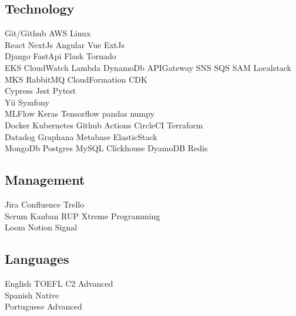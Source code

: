 \documentclass[]{deedy-resume-reversed}
\begin{document}
\begin{minipage}[t]{0.33\textwidth}
\subsection{\fontsize{10}{12}\selectfont Technology}
Git/Github \textbullet{} AWS \textbullet{} Linux \\
React \textbullet{} NextJs \textbullet{} Angular \textbullet{} Vue \textbullet{} ExtJs\\
Django \textbullet{} FastApi \textbullet{} Flask \textbullet{}  Tornado \\
EKS \textbullet{} CloudWatch \textbullet{} Lambda \textbullet{} DynamoDb \textbullet{} APIGateway \textbullet{} SNS  \textbullet{} SQS \textbullet{} SAM \textbullet{} Localstack \textbullet{} MKS \textbullet{} RabbitMQ \textbullet{} CloudFormation \textbullet{} CDK\\
Cypress \textbullet{} Jest \textbullet{} Pytest\\
Yii \textbullet{} Symfony\\
MLFlow \textbullet{} Keras \textbullet{} Tensorflow \textbullet{} pandas \textbullet{} numpy\\
Docker \textbullet{} Kubernetes \textbullet{} Github Actions \textbullet{} CircleCI \textbullet{} Terraform\\
Datadog \textbullet{} Graphana \textbullet{} Metabase \textbullet{} ElasticStack\\
MongoDb \textbullet{} Postgres \textbullet{} MySQL \textbullet{} Clickhouse \textbullet{} DyamoDB \textbullet{} Redis\\
\sectionsep

\subsection{\fontsize{10}{12}\selectfont Management}
Jira \textbullet{} Confluence \textbullet{} Trello \\
Scrum \textbullet{} Kanban \textbullet{} RUP \textbullet{} Xtreme Programming \\
Loom \textbullet{} Notion \textbullet{} Signal\\
\sectionsep

\subsection{\fontsize{10}{12}\selectfont Languages}
English \textbullet{} TOEFL C2 \textbullet{} Advanced\\
Spanish \textbullet{} Native\\
Portuguese \textbullet{} Advanced\\
\sectionsep


\end{minipage}
\end{document}
